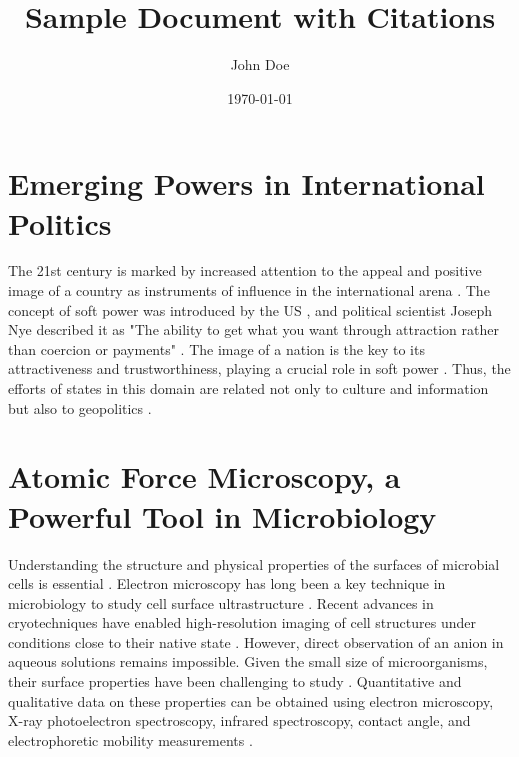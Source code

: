 \documentclass[a4paper]{article}
\title{\textbf{Sample Document with Citations}}
\author{John Doe}
\date{\today}
\begin{document}
    \maketitle
    
    \section{Emerging Powers in International Politics}
    The 21st century is marked by increased attention to the appeal and positive image of a country as instruments of influence in the international arena \cite{bohomolov2012ghost}. The concept of soft power was introduced by the US \cite{sergunin2015understanding}, and political scientist Joseph Nye described it as "The ability to get what you want through attraction rather than coercion or payments" \cite{hill2006moscow}. The image of a nation is the key to its attractiveness and trustworthiness, playing a crucial role in soft power \cite{kiseleva2015russia}. Thus, the efforts of states in this domain are related not only to culture and information but also to geopolitics \cite{kosachev2012spsecific}.

    \section{Atomic Force Microscopy, a Powerful Tool in Microbiology}
    Understanding the structure and physical properties of the surfaces of microbial cells is essential \cite{dufrene2002atomic}. Electron microscopy has long been a key technique in microbiology to study cell surface ultrastructure \cite{engel1999atomic}. Recent advances in cryotechniques have enabled high-resolution imaging of cell structures under conditions close to their native state \cite{franz2008atomic}. However, direct observation of an anion in aqueous solutions remains impossible. Given the small size of microorganisms, their surface properties have been challenging to study \cite{marrese2017atomic}. Quantitative and qualitative data on these properties can be obtained using electron microscopy, X-ray photoelectron spectroscopy, infrared spectroscopy, contact angle, and electrophoretic mobility measurements \cite{altman2015noncontact}.
    
    
    
\end{document}
